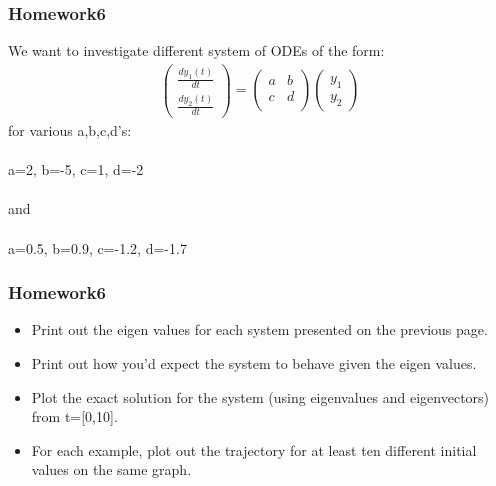 \documentclass{beamer}
\begin{document}
\begin{frame}
\frametitle{Homework6}

We want to investigate different system of ODEs of the form: 
\begin{align*}
\left(\begin{matrix}
\frac{dy_1(t)}{dt}\\
\frac{dy_2(t)}{dt}
\end{matrix} \right)
=
\left(\begin{matrix}
a & b \\
c & d \\
\end{matrix}\right)
\left(\begin{matrix}
y_1\\
y_2
\end{matrix}\right)
\end{align*}
for various a,b,c,d's:\\
\ \\
a=2, b=-5, c=1, d=-2  \\
\ \\
and\\
\ \\
a=0.5, b=0.9, c=-1.2, d=-1.7 


\end{frame} 

\begin{frame}
\frametitle{Homework6}
\begin{itemize}
\item Print out the eigen values for each system presented on the previous page. 
\item Print out how you'd expect the system to behave given the eigen values. 
\item Plot the exact solution for the system (using eigenvalues and eigenvectors) from t=[0,10].
\item For each example, plot out the trajectory for at least ten different initial values on the same graph. 
\end{itemize}
\end{frame}

\end{document}

